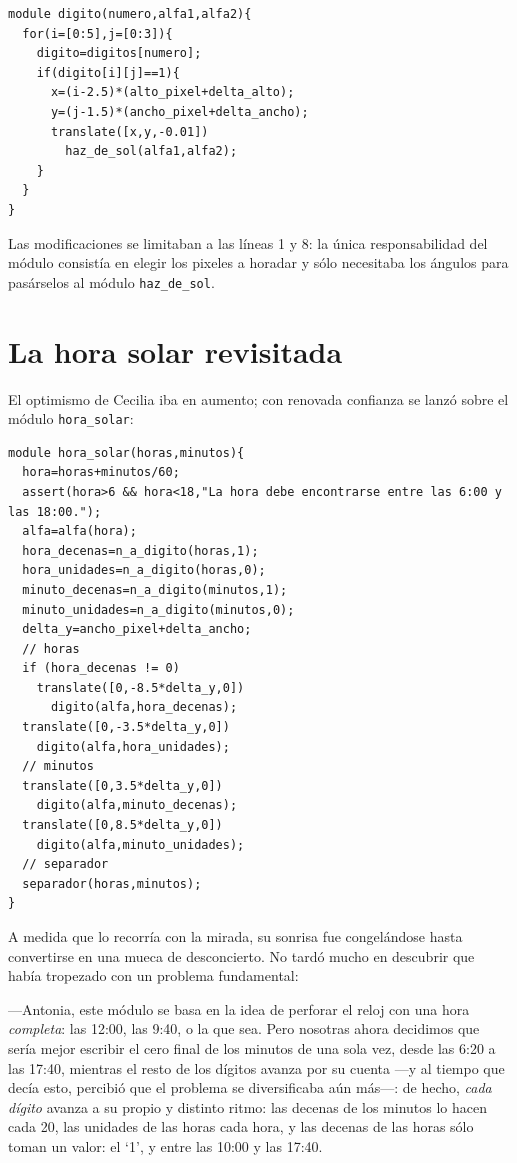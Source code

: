 \begin{lstlisting}
module digito(numero,alfa1,alfa2){
  for(i=[0:5],j=[0:3]){
    digito=digitos[numero];
    if(digito[i][j]==1){
      x=(i-2.5)*(alto_pixel+delta_alto);
      y=(j-1.5)*(ancho_pixel+delta_ancho);
      translate([x,y,-0.01])
        haz_de_sol(alfa1,alfa2);
    }
  }
}
\end{lstlisting}

Las modificaciones se limitaban a las líneas 1 y 8: la única
responsabilidad del módulo consistía en elegir los pixeles a horadar y
sólo necesitaba los ángulos para pasárselos al módulo
\lstinline!haz_de_sol!.

\section{La hora solar revisitada}

El optimismo de Cecilia iba en aumento; con renovada confianza se
lanzó sobre el módulo \lstinline!hora_solar!:

\begin{lstlisting}
module hora_solar(horas,minutos){
  hora=horas+minutos/60;
  assert(hora>6 && hora<18,"La hora debe encontrarse entre las 6:00 y las 18:00.");
  alfa=alfa(hora);
  hora_decenas=n_a_digito(horas,1);
  hora_unidades=n_a_digito(horas,0);
  minuto_decenas=n_a_digito(minutos,1);
  minuto_unidades=n_a_digito(minutos,0);                    
  delta_y=ancho_pixel+delta_ancho;
  // horas    
  if (hora_decenas != 0)
    translate([0,-8.5*delta_y,0])
      digito(alfa,hora_decenas);
  translate([0,-3.5*delta_y,0])
    digito(alfa,hora_unidades);  
  // minutos
  translate([0,3.5*delta_y,0])
    digito(alfa,minuto_decenas);
  translate([0,8.5*delta_y,0])
    digito(alfa,minuto_unidades);  
  // separador
  separador(horas,minutos);
}
\end{lstlisting}

A medida que lo recorría con la mirada, su sonrisa fue congelándose
hasta convertirse en una mueca de desconcierto. No tardó mucho en
descubrir que había tropezado con un problema fundamental:

---Antonia, este módulo se basa en la idea de perforar el reloj con
una hora \emph{completa}: las 12:00, las 9:40, o la que sea. Pero
nosotras ahora decidimos que sería mejor escribir el cero final de los
minutos de una sola vez, desde las 6:20 a las 17:40, mientras el resto
de los dígitos avanza por su cuenta ---y al tiempo que decía esto, percibió
que el problema se diversificaba aún más---: de hecho, \emph{cada
  dígito} avanza a su propio y distinto ritmo: las decenas de los
minutos lo hacen cada 20, las unidades de las horas cada hora, y las
decenas de las horas sólo toman un valor: el `1', y entre las 10:00 y
las 17:40.

